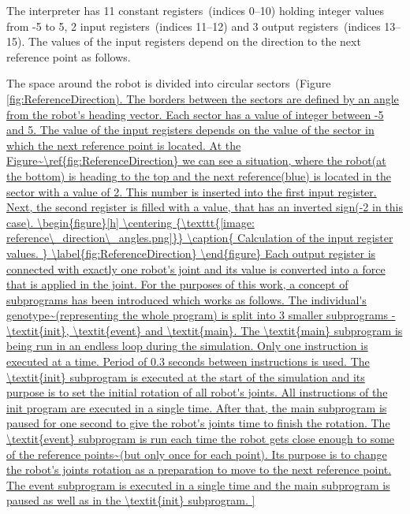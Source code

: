 \documentclass{ExcelAtFIT}
\begin{document}
The interpreter has 11 constant registers~(indices 0–10) holding integer values from -5 to 5, 2 input registers~(indices 11–12) and 3 output registers~(indices 13–15).
The values of the input registers depend on the direction to the next reference point as follows.

The space around the robot is divided into circular sectors~(Figure \ref{fig:ReferenceDirection).
The borders between the sectors are defined by an angle from the robot's heading vector.
Each sector has a value of integer between -5 and 5.
The value of the input registers depends on the value of the sector in which the next reference point is located.
At the Figure~\ref{fig:ReferenceDirection} we can see a situation, where the robot(at the bottom) is heading to the top and the next reference(blue) is located in the sector with a value of 2.
This number is inserted into the first input register.
Next, the second register is filled with a value, that has an inverted sign(-2 in this case).

\begin{figure}[h]
	\centering
	{\texttt{[image: reference\_direction\_angles.png]}}
	\caption{
		Calculation of the input register values.
	}
	\label{fig:ReferenceDirection}
\end{figure}

Each output register is connected with exactly one robot's joint and its value is converted into a force that is applied in the joint.

For the purposes of this work, a concept of subprograms has been introduced which works as follows.

The individual's genotype~(representing the whole program) is split into 3 smaller subprograms - \textit{init}, \textit{event} and \textit{main}.

The \textit{main} subprogram is being run in an endless loop during the simulation.
Only one instruction is executed at a time.
Period of 0.3 seconds between instructions is used.

The \textit{init} subprogram is executed at the start of the simulation and its purpose is to set the initial rotation of all robot's joints.
All instructions of the init program are executed in a single time.
After that, the main subprogram is paused for one second to give the robot's joints time to finish the rotation.

The \textit{event} subprogram is run each time the robot gets close enough to some of the reference points~(but only once for each point).
Its purpose is to change the robot's joints rotation as a preparation to move to the next reference point.
The event subprogram is executed in a single time and the main subprogram is paused as well as in the \textit{init} subprogram.

}
\end{document}
